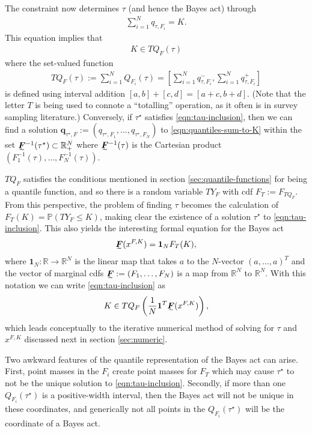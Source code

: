 \documentclass{article}\usepackage[]{graphicx}\usepackage[]{xcolor}
\begin{document}
The constraint now determines $\tau$ (and hence the Bayes act) through 
\begin{align}
\sum_{i=1}^{N} q_{\tau,F_i} = K. \label{eqn:quantiles-sum-to-K}
\end{align}
This equation implies that 
\begin{align}
K \in TQ_F(\tau) \label{eqn:tau-inclusion}
\end{align}
where the set-valued function
\begin{align}
TQ_F(\tau) := \sum_{i=1}^{N} Q_{F_i}(\tau) = \left[\sum_{i=1}^{N} q^{-}_{\tau,F_i}, \sum_{i=1}^{N} q^{+}_{\tau,F_i}\right]
\end{align}
is defined using interval addition $[a,b] + [c,d] = [a+c, b+d]$. (Note that the letter $T$ is being used to connote a ``totalling'' 
operation, as it often is in survey sampling literature.) Conversely, if $\tau^{\star}$ satisfies \eqref{eqn:tau-inclusion}, then
we can find a solution $\bm{q}_{\tau^{\star},F} := (q_{\tau^{\star},F_1},\ldots,q_{\tau^{\star},F_N})$ to 
\eqref{eqn:quantiles-sum-to-K} within the set 
$\undertilde{\bm{F}}^{-1}(\tau^{\star}) \subset \mathbb{R}_{+}^N$ where $\undertilde{\bm{F}}^{-1}(\tau)$  is the 
Cartesian product $(F_1^{-1}(\tau),\ldots,F_N^{-1}(\tau))$.

$TQ_F$ satisfies the conditions mentioned in section \ref{sec:quantile-functions} for being a quantile function, and so there
is a random variable $TY_F$ with cdf $F_{T} := F_{TQ_F}$.  From this perspective, the problem of finding $\tau$ becomes the calculation 
of $F_{T}(K) = \mathbb{P}(TY_F \leq K)$, making clear the existence of a solution $\tau^{\star}$ to \eqref{eqn:tau-inclusion}. This also
yields the interesting formal equation for the Bayes act
\begin{align}
\undertilde{\bm{F}}(x^{F,K}) = \mathbf{1}_N F_{T}(K),
\end{align}
where $\mathbf{1}_N: \mathbb{R} \to \mathbb{R}^N$ is the linear map that takes $a$ to the $N$-vector $(a,\ldots,a)^T$ and the vector of marginal 
cdfs $\undertilde{\bm{F}} := (F_1,\ldots,F_N)$ is a map from $\mathbb{R}^N$ to $\mathbb{R}^N$. 
With this notation we can write \eqref{eqn:tau-inclusion} as
\begin{align}
K \in TQ_F\left(\frac{1}{N} \mathbf{1}^T \undertilde{\bm{F}}(x^{F,K})\right),
\end{align}
which leads conceptually to the iterative numerical method of solving for $\tau$ and $x^{F,K}$ discussed next in section \ref{sec:numeric}. 

Two awkward features of the quantile representation of the Bayes act can arise.  First, point masses in the $F_i$ create point masses for $F_T$ which may cause $\tau^{\star}$ to not be the unique solution to \eqref{eqn:tau-inclusion}. Secondly, if more than 
one $Q_{F_i}(\tau^{\star})$ is a positive-width interval, then the Bayes act will not be unique in these coordinates, and generically
not all points in the $Q_{F_i}(\tau^{\star})$ will be the coordinate of a Bayes act.
\end{document}
